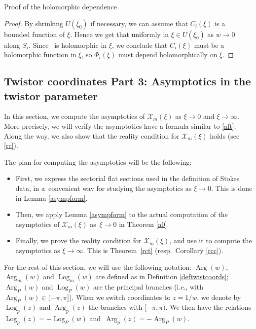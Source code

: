 \documentclass[11pt]{article}
\numberwithin{equation}{section}
\numberwithin{equation}{section}
\newcommand{\MC}{\mathcal{X}_m}
\begin{document}
\begin{subsubsection}{Proof of the holomorphic dependence}
\begin{proof}
By shrinking $U(\xi_0)$ if necessary, we can assume that $C_i(\xi)$ is a bounded function of $\xi$. Hence we get that
uniformly in $\xi \in U(\xi_0)$ as $w\to 0$ along $S_i$. Since~ is holomorphic in $\xi$, we conclude that $C_i(\xi)$ must be a holomorphic function in $\xi$, so $\Phi_i(\xi)$ must depend holomorphically on $\xi$.
\end{proof}
\end{subsubsection}


\subsection{Twistor coordinates Part 3: Asymptotics in the twistor parameter}

In this section, we compute the asymptotics of $\MC(\xi)$ as $\xi \to 0$ and $\xi \to \infty$. More precisely, we will verify the asymptotics have a formula similar to \eqref{aft}. Along the way, we also show that the reality condition for $\MC(\xi)$ holds (see \eqref{rc}).

The plan for computing the asymptotics will be the following:
\begin{itemize}\itemsep=0pt
 \item First, we express the sectorial flat sections used in the definition of Stokes data, in a~convenient way for studying the asymptotics as $\xi \to 0$. This is done in Lemma \ref{asympform}.
 \item Then, we apply Lemma \ref{asympform} to the actual computation of the asymptotics of $\MC(\xi)$ as~${\xi \to 0}$ in Theorem \ref{a0}.
 \item Finally, we prove the reality condition for $\MC(\xi)$, and use it to compute the asymptotics as $\xi\to \infty$. This is Theorem~\ref{rct} (resp.~Corollary \ref{rcc}).
\end{itemize}

\begin{Notation} For the rest of this section, we will use the following notation: $\operatorname{Arg}(w)$, $\operatorname{Arg}_m(w)$ and $\operatorname{Log}_m(w)$ are defined as in Definition \ref{deftwistcoords}; $\operatorname{Arg}_P(w)$ and $\operatorname{Log}_P(w)$ are the principal branches (i.e., with $\operatorname{Arg}_P(w)\in (-\pi,\pi]$). When we switch coordinates to $z=1/w$, we denote by $\operatorname{Log}_p(z)$ and $\operatorname{Arg}_p(z)$ the branches with $[-\pi,\pi)$. We then have the relations $\operatorname{Log}_{p}(z)=-\operatorname{Log}_P(w)$ and~${\operatorname{Arg}_{p}(z)=-\operatorname{Arg}_P(w)}$.
\end{Notation}
\end{document}
